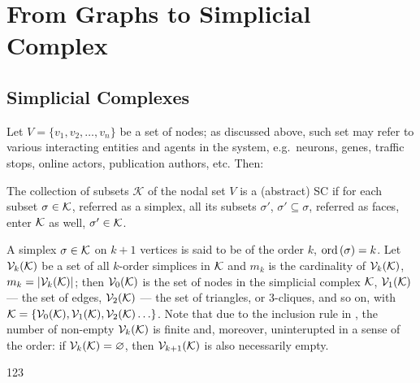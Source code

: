 \section{ From Graphs to Simplicial Complex }


\subsection{ Simplicial Complexes }


Let \( V = \{ v_1, v_2, \ldots, v_n \} \) be a set of nodes; as discussed above, such set may refer to various interacting entities and agents in the system, e.g.\ neurons, genes, traffic stops, online actors, publication authors, etc. Then: 

\begin{definition}\label{def:simplicial_complex}
      The collection of subsets \( \mathcal K \) of the nodal set \( V \) is  a (abstract) \gls{SC} if for each subset \( \sigma \in \mathcal{K} \), referred as a \gls{simplex}, all its subsets \( \sigma'\), \( \sigma' \subseteq \sigma \), referred as \glspl{face}, enter \( \mathcal{K} \) as well, \( \sigma' \in \mathcal{K}\).
\end{definition}

A simplex \( \sigma \in \mathcal{K} \) on \( k + 1 \) vertices is said to be of the order \( k \), \( \mathrm{ord}\,(\sigma) = k \). Let \( \mathcal{V}_{k}(\mathcal{K}) \) be a set of all \(k\)-order simplices in \( \mathcal{K} \) and \( m_k \) is the cardinality of \( \mathcal{V}_{k}(\mathcal{K})\), \( m_k = | \mathcal{V}_{k}(\mathcal{K}) | \); then \( \mathcal{V}_{0}(\mathcal{K}) \) is the set of nodes in the simplicial complex \( \mathcal{K} \), \( \mathcal{V}_{1}(\mathcal{K}) \) --- the set of edges, \( \mathcal{V}_{2}(\mathcal{K}) \) --- the set of triangles, or \(3\)-cliques, and so on, with \( \mathcal{K} = \{ \mathcal{V}_{0}(\mathcal{K}), \mathcal{V}_{1}(\mathcal{K}), \mathcal{V}_{2}(\mathcal{K}) \ldots \} \). Note that due to the inclusion rule in , the number of non-empty \( \mathcal{V}_{k}(\mathcal{K}) \) is finite and, moreover, uninterupted in a sense of the order: if \( \mathcal{V}_{k}(\mathcal{K}) = \varnothing \), then \( \mathcal{V}_{k+1}(\mathcal{K}) \) is also necessarily empty.

\begin{example}

      123
      
\end{example}

